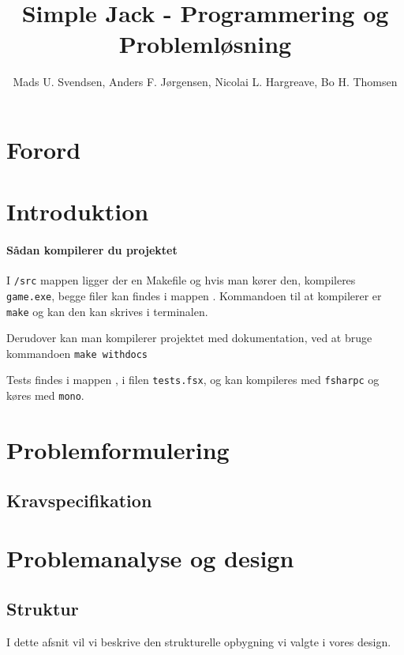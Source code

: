 \documentclass[a4paper]{article}
\title{Simple Jack - Programmering og Problemløsning}
\author{Mads U. Svendsen, Anders F. Jørgensen, Nicolai L. Hargreave, Bo H. Thomsen}
\begin{document}
	\maketitle %
        
  \tableofcontents

  \newpage

\section{Forord}
    
\section{Introduktion}
   \paragraph*{Sådan kompilerer du projektet\\}
    I \lstinline$/src$ mappen ligger der en Makefile og hvis man kører den, 
    kompileres \lstinline$game.exe$,
    begge filer kan findes i mappen .
    Kommandoen til at kompilerer er  \lstinline$make$ og kan den kan skrives i terminalen.

    Derudover kan man kompilerer projektet med dokumentation, ved at bruge kommandoen \lstinline$make withdocs$

    Tests findes i  mappen , i filen \lstinline$tests.fsx$,
    og kan kompileres med \lstinline$fsharpc$ og køres med \lstinline$mono$.

\newpage

\section{Problemformulering}
    
    \subsection{Kravspecifikation}

  \newpage

  \section{Problemanalyse og design}
    \subsection*{Struktur}
      I dette afsnit vil vi beskrive den strukturelle opbygning vi valgte i vores design.
\end{document}
